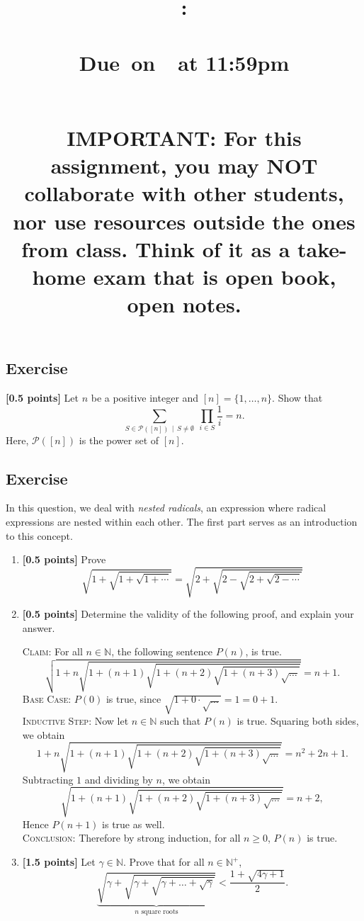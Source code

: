 \documentclass{article}
\title{
    \vspace{2in}
    \textbf{\hmwkClass:\\ \hmwkTitle} \\
    \normalsize\vspace{0.1in}\small{Due\ on\ \hmwkDueDate\ at 11:59pm} \\
    \vspace{0.1in}\large{\textit{\hmwkClassInstructor\ \hmwkSection}} \\
    \vspace{1in}
    \begin{minipage}[t]{0.5\columnwidth}
    {\footnotesize \textbf{IMPORTANT:} For this assignment, you may NOT collaborate with other students, nor use resources outside the ones from class. Think of it as a take-home exam that is open book, open notes.}
    \end{minipage}
    \vspace{1in}
    \author{\textbf{\hmwkAuthorName}}
    \date{}
}
\newcounter{counter}
\newcommand{\Exercise}{Exercise \stepcounter{counter}\thecounter}
\begin{document}
    
\maketitle
\pagebreak

\subsection*{\Exercise}
    {\bf [0.5 points]} Let $n$ be a positive integer and $[n] = \{1, \dots, n\}$. Show that $$\sum_{S \in \mathcal{P}([n]) \, \mid \, S \ne \emptyset} \: \prod_{i \in S} \frac{1}{i} = n.$$ Here, $\mathcal{P}([n])$ is the power set of $[n]$.

\subsection*{\Exercise}
    In this question, we deal with \textit{nested radicals}, an expression where radical expressions are nested within each other. The first part serves as an introduction to this concept.
    
    \begin{enumerate}
        \item {\bf [0.5 points]} Prove $$\sqrt{1 + \sqrt{1+ \sqrt{1 + \cdots}}} = \sqrt{2 + \sqrt{2 - \sqrt{2 + \sqrt{2 - \cdots}}}}$$
        \item {\bf [0.5 points]} Determine the validity of the following proof, and explain your answer.
        
        \vspace{1.5mm}
        \textsc{Claim}: For all $n \in \mathbb{N}$, the following sentence $P(n)$, is true.
        $$\sqrt{1+n\sqrt{1+(n+1)\sqrt{1+(n+2)\sqrt{1+(n+3)\sqrt{\ldots}}}}}=n+1.$$
        \textsc{Base Case}: $P(0)$ is true, since $\sqrt{1 + 0 \cdot \sqrt{\dots}} = 1 = 0 + 1$. \\
        \textsc{Inductive Step}: Now let $n \in \mathbb{N}$ such that $P(n)$ is true. Squaring both sides, we obtain
        $$1+n\sqrt{1+(n+1)\sqrt{1+(n+2)\sqrt{1+(n+3)\sqrt{\ldots}}}}=n^2+2n+1.$$ Subtracting $1$ and dividing by $n$, we obtain $$\sqrt{1+(n+1)\sqrt{1+(n+2)\sqrt{1+(n+3)\sqrt{\ldots}}}}=n+2,$$
        Hence $P(n + 1)$ is true as well. \\
        \textsc{Conclusion}: Therefore by strong induction, for all $n \ge 0$, $P(n)$ is true.
        \item {\bf [1.5 points]} Let $\gamma \in \mathbb{N}$. Prove that for all $n \in \mathbb{N^{+}}$, $$\underbrace{\sqrt{\gamma + \sqrt{\gamma + \sqrt{\gamma + \dots + \sqrt{\gamma}}}}}_{\text{$n$ square roots}} < \frac{1 + \sqrt{4\gamma + 1}}{2}.$$
    \end{enumerate}
\end{document}
